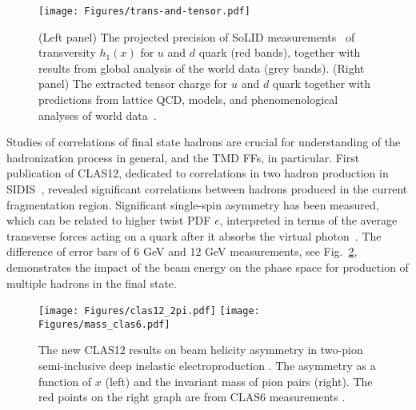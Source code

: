 \begin{figure}[!h]
\begin{center}
\texttt{[image: Figures/trans-and-tensor.pdf]}
\caption{(Left panel) The projected precision of SoLID measurements~\cite{SoLID-SIDIS-p,SoLID-SIDIS-He3-T} of transversity $h_{1}(x)$ for $u$ and $d$ quark (red bands), together with results from global analysis of the world data (grey bands). (Right panel) The extracted tensor charge for $u$ and $d$ quark together with predictions from lattice QCD, models, and phenomenological analyses of world data~\cite{YE201791}.  
\label{fig:SoLID-transversity}}
\end{center}
\end{figure}
\iffalse
\begin{figure}
\begin{center}
\texttt{[image: SoLID-TensorCharge.pdf]}
\caption{The projected precision of extraction of the tensor charge from SoLID measurements~\cite{SoLID-SIDIS-He3-T,SoLID-SIDIS-p} along with LQCD calculations, other theory/model predictions and phenomenological determinations from current world data.}
\end{center}
\label{fig:tensorcharge}
\end{figure}
\fi 

Studies of correlations of final state hadrons are crucial for understanding of the hadronization process in general, and the TMD FFs, in particular. First publication of CLAS12, dedicated to correlations in two hadron production in SIDIS~\cite{Hayward:2021psm}, revealed significant correlations between hadrons produced in the current fragmentation region. Significant single-spin asymmetry has been measured, which can be related to higher twist PDF $e$, interpreted in terms of
the average transverse forces acting on a quark after
it absorbs the virtual photon~\cite{Burkardt:2008vd}. The difference of error bars of 6 GeV and 12 GeV measurements, see Fig.~\ref{fig:clas12dih}, demonstrates the impact of the beam energy on the phase space for production of multiple hadrons in the final state.

\begin{figure}[ht]
\begin{center}
\texttt{[image: Figures/clas12\_2pi.pdf]}
\texttt{[image: Figures/mass\_clas6.pdf]}
\caption{The new CLAS12 results on beam helicity asymmetry in two-pion semi-inclusive deep inelastic electroproduction \cite{Hayward:2021psm}. The asymmetry as a function of $x$ (left) and the invariant mass of pion pairs (right). The red points on the right graph are from CLAS6 measurements \cite{Mirazita:2020lik}.}
\label{fig:clas12dih}
\end{center}
\end{figure}

